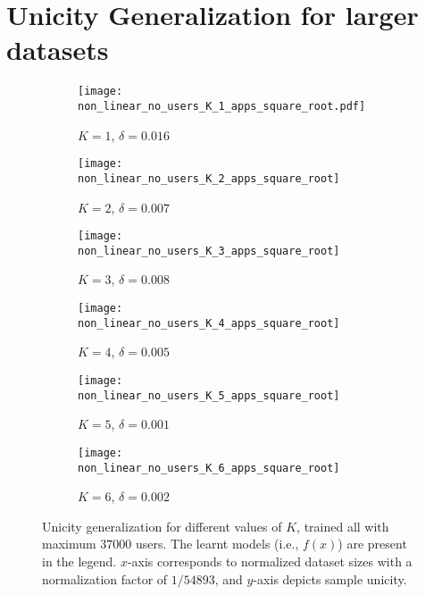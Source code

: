 \documentclass{acm_proc_article-sp}
\theoremstyle{plain}
\theoremstyle{plain}
\theoremstyle{plain}
\theoremstyle{plain}
\theoremstyle{plain}
\theoremstyle{plain}
\begin{document}
\section{Unicity Generalization for larger datasets}



\begin{figure*}[!t]
        \centering
        \begin{subfigure}[]{0.3\textwidth}
                \texttt{[image: non\_linear\_no\_users\_K\_1\_apps\_square\_root.pdf]}
                \caption{$K=1$, $\delta = 0.016$}
                \label{fig:K_1}
        \end{subfigure}
\begin{subfigure}[]{0.3\textwidth}
                \texttt{[image: non\_linear\_no\_users\_K\_2\_apps\_square\_root]}
                \caption{$K=2$, $\delta = 0.007$}
                \label{fig:K_2}
        \end{subfigure}
\begin{subfigure}[]{0.3\textwidth}
                \texttt{[image: non\_linear\_no\_users\_K\_3\_apps\_square\_root]}
                \caption{$K=3$, $\delta = 0.008$}
                \label{fig:K_3}
        \end{subfigure}
        \begin{subfigure}[]{0.3\textwidth}
                \texttt{[image: non\_linear\_no\_users\_K\_4\_apps\_square\_root]}
                \caption{$K=4$, $\delta = 0.005$}
                \label{fig:K_4}
        \end{subfigure}
        \begin{subfigure}[]{0.3\textwidth}
                \texttt{[image: non\_linear\_no\_users\_K\_5\_apps\_square\_root]}
                \caption{$K=5$, $\delta = 0.001$}
                \label{fig:K_5}
        \end{subfigure}
    \begin{subfigure}[]{0.3\textwidth}
                \texttt{[image: non\_linear\_no\_users\_K\_6\_apps\_square\_root]}
                \caption{$K=6$, $\delta = 0.002$}
                \label{fig:K_6}
        \end{subfigure}
\caption{Unicity generalization for different values of $K$, trained all with maximum $37000$ users. The learnt models (i.e., $f(x)$) are present in the legend. $x$-axis corresponds to normalized dataset sizes with a normalization factor of $1/54893$, and $y$-axis depicts sample unicity.}
    \label{fig:unicity_generalization}
\end{figure*}
\end{document}
